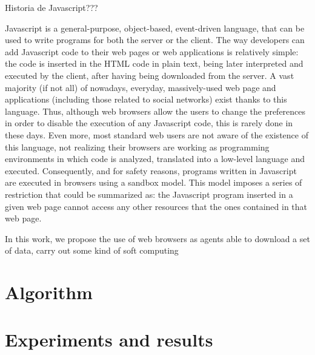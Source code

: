 \documentclass{llncs}
\begin{document}
Historia de Javascript??? 

Javascript is a general-purpose, object-based, event-driven language, that can be used to write programs for both the server or the client.  The way developers can add Javascript code to their web pages or web applications is relatively simple: the code is inserted in the HTML code in plain text, being later interpreted and executed by the client, after having being downloaded from the server. A vast majority (if not all) of nowadays, everyday, massively-used web page and applications (including those related to social networks) exist thanks to this language. Thus, although web browsers allow the users to change the preferences in order to disable the execution of any Javascript code, this is rarely done in these days. Even more, most standard web users are not aware of the existence of this language, not realizing their browsers are working as programming environments in which code is analyzed, translated into a low-level language and executed. Consequently, and for safety reasons, programs written in Javascript are executed in browsers using a sandbox model. This model imposes a series of restriction that could be summarized as: the Javascript program inserted in a given web page cannot access any other resources that the ones contained in that web page.

In this work, we propose the use of web browsers as agents able to download a set of data, carry out some kind of soft computing 

\section{Algorithm}
\section{Experiments and results}
\end{document}
